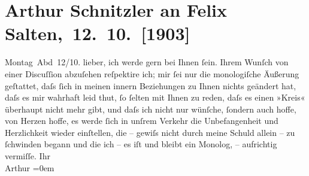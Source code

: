 

         
         \renewcommand{\erwaehntePersonen}{Personen: Felix Salten}
         \renewcommand{\erwaehnteOrte}{Orte: Wien}
         \renewcommand{\erwaehnteWerke}{}
               \section[ Arthur Schnitzler an Felix Salten, 12. 10. {[}1903{]}]{ Arthur Schnitzler an Felix Salten, 12. 10. {[}1903{]}}\nopagebreak{}\rehead{ }\begin{ledgroupsized}[t]{13cm}\normalsize\beginnumbering{} \toendnotes[C]{\smallbreak\pagebreak[2]} 
\toendnotes[C]{\smallbreak}\pstart
           \raggedleft{}{\pb}Montag Abd 12/10.\pend
           \pstart
           lieber, ich werde \label{K_L02984-1v}\label{K_L02984-1h} gern bei Ihnen ſein. Ihrem Wunſch von einer Discuſſion abzuſehen reſpektire
               ich; mir ſei nur die monologiſche Äußerung geſtattet, daſs ſich in meinen innern
               Beziehungen zu Ihnen nichts geändert hat, daſs es mir wahrhaft leid thut, ſo ſelten
               mit Ihnen zu reden, daſs es {\pb}einen »Kreis«
               überhaupt nicht mehr gibt, und daſs ich nicht nur wünſche, ſondern auch hoffe,  von Herzen hoffe, es werde ſich in unſrem Verkehr
               die Unbefangenheit und Herzlichkeit wieder einſtellen, die – gewiſs nicht durch meine
               Schuld allein – zu ſchwinden begann und die ich – es iſt {\pb}und bleibt ein Monolog, – aufrichtig
               vermiſſe.\pend
           \pstart
           Ihr {\\[\baselineskip]}\spacefill\mbox{Arthur}\pend
           \leftskip=0em{}
         
         \endnumbering{}\end{ledgroupsized}  \newcommand{\dateiname}{L02984}\newcommand{\titel}{Arthur Schnitzler an Felix Salten, 12. 10. [1903]}\newcommand{\editorInnen}{Martin Anton Müller und Laura Untner}
      